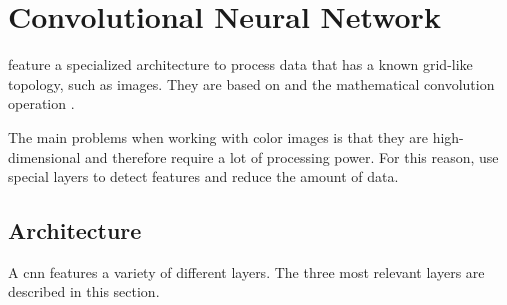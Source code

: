 \section{Convolutional Neural Network}
\label{sec:theoretical_background:cnn}

 feature a specialized architecture to process data that has a known grid-like topology, such as images.
They are based on  and the mathematical convolution operation \cite[p.~326--331]{deeplearningbook}.



The main problems when working with color images is that they are high-dimensional and therefore require a lot of processing power.
For this reason,  use special layers to detect features and reduce the amount of data.

\subsection{Architecture}
\label{subsec:theoretical_background:cnn:architecture}

A \acrlong{cnn} features a variety of different layers.
The three most relevant layers are described in this section.

